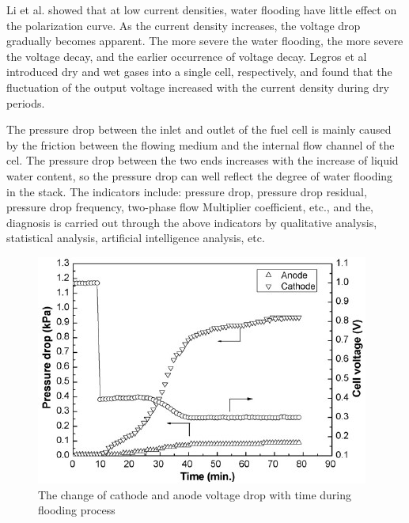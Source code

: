 \par
Li et al.\cite{liReviewWaterFlooding2008} showed that at low current densities, water flooding have little effect on the polarization curve. As the current density increases, the voltage drop gradually becomes apparent. The more severe the water flooding, the more severe the voltage decay, and the earlier occurrence of voltage decay. Legros et al\cite{legrosFirstResultsPEMFC2011} introduced dry and wet gases into a single cell, respectively, and found that the fluctuation of the output voltage increased with the current density during dry periods.
\par
The pressure drop between the inlet and outlet of the fuel cell is mainly caused by the friction between the flowing medium and the internal flow channel of the cel\cite{wuDiagnosticToolsPEM2008}. The pressure drop between the two ends increases with the increase of liquid water content, so the pressure drop can well reflect the degree of water flooding in the stack. The indicators include: pressure drop, pressure drop residual, pressure drop frequency, two-phase flow Multiplier coefficient, etc., and the, diagnosis is carried out through the above indicators by qualitative analysis, statistical analysis, artificial intelligence analysis, etc.\cite{liNovelApproachDetermine2017}
\par
\begin{figure}[h]
	\centering

	\includegraphics{Research_pictures/Fig1.jpg}
	\caption[short]{The change of cathode and anode voltage drop with time during flooding process}
	\label{fig:figure1}
\end{figure}
